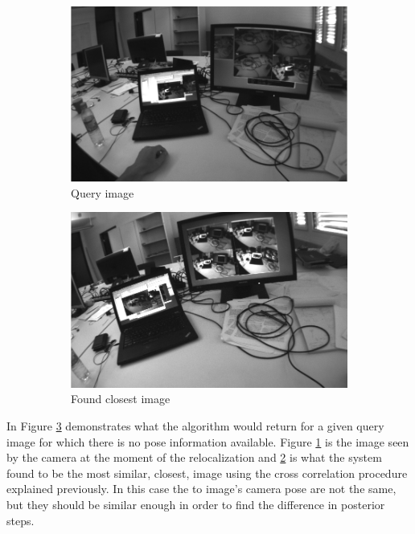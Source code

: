 \begin{figure}[!htpb]
  \centering
  \begin{subfigure}[b]{0.6\linewidth}
    \includegraphics[width=\linewidth]{img/query_1.png}
    \caption{Query image}
    \label{fig:query_1}
  \end{subfigure}
  \quad
  \begin{subfigure}[b]{0.6\linewidth}
    \includegraphics[width=\linewidth]{img/best_match_1.png}
    \caption{Found closest image}
    \label{fig:best_match_1}
  \end{subfigure}
  \caption{}
  \label{fig:cc_example}
\end{figure}


In Figure \ref{fig:cc_example} demonstrates what the algorithm would return for a given query image for which there is no pose information available. Figure \ref{fig:query_1} is the image seen by the camera at the moment of the relocalization and \ref{fig:best_match_1} is what the system found to be the most similar, closest, image using the cross correlation procedure explained previously. In this case the to image's camera pose are not the same, but they should be similar enough in order to find the difference in posterior steps.\\

